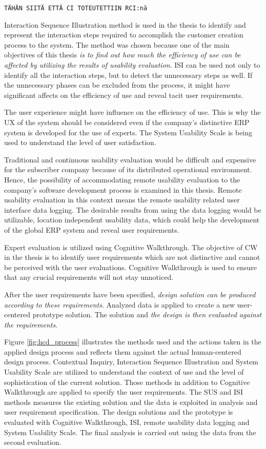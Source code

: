\documentclass[12pt,a4paper,oneside,pdftex]{report}
\begin{document}
\texttt{TÄHÄN SIITÄ ETTÄ CI TOTEUTETTIIN RCI:nä}

Interaction Sequence Illustration method is used in the thesis to identify and represent the interaction steps required to accomplish the customer creation process to the system. The method was chosen because one of the main objectives of this thesis \emph{is to find out how much the efficiency of use can be affected by utilizing the results of usability evaluation}. ISI can be used not only to identify all the interaction steps, but to detect the unnecessary steps as well. If the unnecessary phases can be excluded from the process, it might have significant affects on the efficiency of use and reveal tacit user requirements. 

The user experience might have influence on the efficiency of use. This is why the UX of the system should be considered even if the company's distinctive ERP system is developed for the use of experts. The System Usability Scale is being used to understand the level of user satisfaction.

Traditional and continuous usability evaluation would be difficult and expensive for the subscriber company because of its distributed operational environment. Hence, the possibility of accommodating remote usability evaluation to the company's software development process is examined in this thesis. Remote usability evaluation in this context means the remote usability related user interface data logging. The desirable results from using the data logging would be utilizable, location independent usability data, which could help the development of the global ERP system and reveal user requirements. 

Expert evaluation is utilized using Cognitive Walkthrough. The objective of CW in the thesis is to identify user requirements which are not distinctive and cannot be perceived with the user evaluations. Cognitive Walkthrough is used to ensure that any crucial requirements will not stay unnoticed.

After the user requirements have been specified, \emph{design solution can be produced according to these requirements}. Analyzed data is applied to create a new user-centered prototype solution. The solution and \emph{the design is then evaluated against the requirements}. 

Figure \ref{fig:hcd_process} illustrates the methods used and the actions taken in the applied design process and reflects them against the actual human-centered design process. Contextual Inquiry, Interaction Sequence Illustration and System Usability Scale are utilized to understand the context of use and the level of sophistication of the current solution. Those methods in addition to Cognitive Walkthrough are applied to specify the user requirements. The SUS and ISI methods measures the existing solution and the data is exploited in analysis and user requirement specification. The design solutions and the prototype is evaluated with Cognitive Walkthrough, ISI, remote usability data logging and System Usability Scale. The final analysis is carried out using the data from the second evaluation.  
\end{document}
